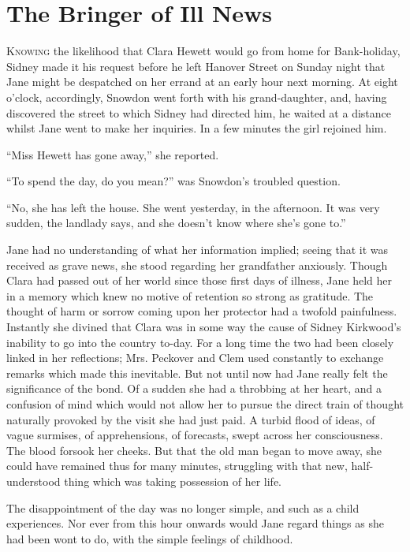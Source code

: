 \chapter{The Bringer of Ill News}

\textsc{Knowing} the likelihood that Clara Hewett would go from home for
Bank-holiday, Sidney made it his request before he left Hanover Street
on Sunday night that Jane might be despatched on her errand at an early
hour next morning. At eight o'clock, accordingly, Snowdon went forth
with his grand-daughter, and, having discovered the street to which
Sidney had directed him, he waited at a distance whilst Jane went to
make her inquiries. In a few minutes the girl rejoined him.

``Miss Hewett has gone away,'' she reported.

``To spend the day, do you mean?'' was Snowdon's troubled question.

``No, she has left the house. She went yesterday, in the afternoon. It
was very {}sudden, the landlady says, and she doesn't know where she's
gone to.''

Jane had no understanding of what her information implied; seeing that
it was received as grave news, she stood regarding her grandfather
anxiously. Though Clara had passed out of her world since those first
days of illness, Jane held her in a memory which knew no motive of
retention so strong as gratitude. The thought of harm or sorrow coming
upon her protector had a twofold painfulness. Instantly she divined that
Clara was in some way the cause of Sidney Kirkwood's inability to go
into the country to-day. For a long time the two had been closely linked
in her reflections; Mrs. Peckover and Clem used constantly to exchange
remarks which made this inevitable. But not until now had Jane really
felt the significance of the bond. Of a sudden she had a throbbing at
her heart, and a confusion of mind which would not allow her to pursue
the direct train of thought naturally provoked by the visit she had just
paid. A turbid flood of ideas, of {}vague surmises, of apprehensions, of
forecasts, swept across her consciousness. The blood forsook her cheeks.
But that the old man began to move away, she could have remained thus
for many minutes, struggling with that new, half-understood thing which
was taking possession of her life.

The disappointment of the day was no longer simple, and such as a child
experiences. Nor ever from this hour onwards would Jane regard things as
she had been wont to do, with the simple feelings of childhood.

